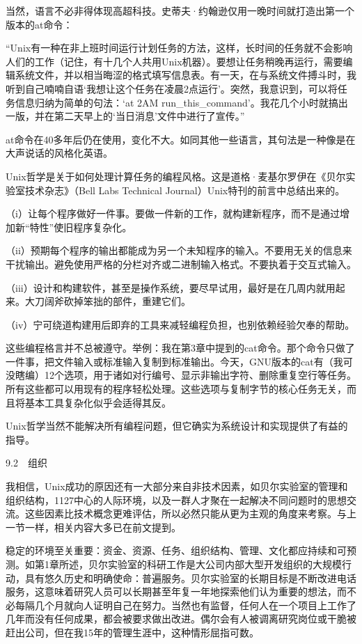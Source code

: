 \documentclass[a4paper,12pt,UTF8,twoside]{ctexbook}
\begin{document}
当然，语言不必非得体现高超科技。史蒂夫·约翰逊仅用一晚时间就打造出第一个版本的at命令：

“Unix有一种在非上班时间运行计划任务的方法，这样，长时间的任务就不会影响人们的工作（记住，有十几个人共用Unix机器）。要想让任务稍晚再运行，需要编辑系统文件，并以相当晦涩的格式填写信息表。有一天，在与系统文件搏斗时，我听到自己喃喃自语‘我想让这个任务在凌晨2点运行’。突然，我意识到，可以将任务信息归纳为简单的句法：‘at 2AM run\_this\_command’。我花几个小时就搞出一版，并在第二天早上的‘当日消息’文件中进行了宣传。”



at命令在40多年后仍在使用，变化不大。如同其他一些语言，其句法是一种像是在大声说话的风格化英语。

Unix哲学是关于如何处理计算任务的编程风格。这是道格·麦基尔罗伊在《贝尔实验室技术杂志》（Bell Labs Technical Journal）Unix特刊的前言中总结出来的。

（i）让每个程序做好一件事。要做一件新的工作，就构建新程序，而不是通过增加新“特性”使旧程序复杂化。

（ii）预期每个程序的输出都能成为另一个未知程序的输入。不要用无关的信息来干扰输出。避免使用严格的分栏对齐或二进制输入格式。不要执着于交互式输入。

（iii）设计和构建软件，甚至是操作系统，要尽早试用，最好是在几周内就用起来。大刀阔斧砍掉笨拙的部件，重建它们。

（iv）宁可绕道构建用后即弃的工具来减轻编程负担，也别依赖经验欠奉的帮助。

这些编程格言并不总被遵守。举例：我在第3章中提到的cat命令。那个命令只做了一件事，把文件输入或标准输入复制到标准输出。今天，GNU版本的cat有（我可没瞎编）12个选项，用于诸如对行编号、显示非输出字符、删除重复空行等任务。所有这些都可以用现有的程序轻松处理。这些选项与复制字节的核心任务无关，而且将基本工具复杂化似乎会适得其反。

Unix哲学当然不能解决所有编程问题，但它确实为系统设计和实现提供了有益的指导。





9.2　组织


我相信，Unix成功的原因还有一大部分来自非技术因素，如贝尔实验室的管理和组织结构，1127中心的人际环境，以及一群人才聚在一起解决不同问题时的思想交流。这些因素比技术概念更难评估，所以必然只能从更为主观的角度来考察。与上一节一样，相关内容大多已在前文提到。

稳定的环境至关重要：资金、资源、任务、组织结构、管理、文化都应持续和可预测。如第1章所述，贝尔实验室的科研工作是大公司内部大型开发组织的大规模行动，具有悠久历史和明确使命：普遍服务。贝尔实验室的长期目标是不断改进电话服务，这意味着研究人员可以长期甚至年复一年地探索他们认为重要的想法，而不必每隔几个月就向人证明自己在努力。当然也有监督，任何人在一个项目上工作了几年而没有任何成果，都会被要求做出改进。偶尔会有人被调离研究岗位或干脆被赶出公司，但在我15年的管理生涯中，这种情形屈指可数。
\end{document}
